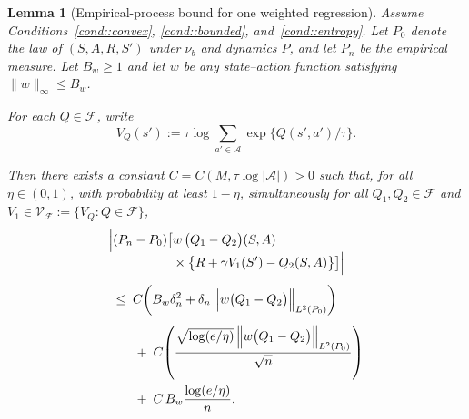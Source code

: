 \documentclass{article}
\theoremstyle{plain}
\newtheorem{lemma}{Lemma}
\theoremstyle{definition}
\theoremstyle{remark}
\begin{document}
\begin{lemma}[Empirical-process bound for one weighted regression]
\label{lemma::empiricalprocess}
Assume Conditions~\ref{cond::convex}, \ref{cond::bounded}, and~\ref{cond::entropy}.
Let $P_0$ denote the law of $(S,A,R,S')$ under $\nu_b$ and dynamics $P$,
and let $P_n$ be the empirical measure.
Let $B_w\ge1$ and let $w$ be any state--action function satisfying
\(\|w\|_\infty\le B_w\).

For each \(Q\in\mathcal F\), write
\[
V_Q(s')
:= \tau\log\sum_{a'\in\mathcal A}\exp\{Q(s',a')/\tau\}.
\]

Then there exists a constant
\(C=C(M,\tau\log|\mathcal A|)>0\) such that, for all
$\eta \in (0,1)$, with probability at least $1 - \eta$,
simultaneously for all \(Q_1,Q_2\in\mathcal F\) and
\(V_1\in\mathcal V_{\mathcal F}:=\{V_Q:Q\in\mathcal F\}\),
\begin{align*}
&\Bigl|
  (P_n - P_0)\big[
    w\,
    \bigl(Q_1-Q_2\bigr)(S,A)
\\[-0.4em]
&\qquad\qquad\quad
    \times
    \bigl\{
      R
      + \gamma V_1(S')
      - Q_2(S,A)
    \bigr\}
  \big]
\Bigr|
\\[0.4em]
&\;\le\;
C\!\left(
  B_w\delta_n^2
  +
  \delta_n\,
  \Bigl\|
    w\bigl(Q_1-Q_2\bigr)
  \Bigr\|_{L^2(P_0)}
\right)
\\[0.4em]
&\qquad+\;
C\!\left(
  \frac{
    \sqrt{\log(e/\eta)}\,
    \Bigl\|
      w\bigl(Q_1-Q_2\bigr)
    \Bigr\|_{L^2(P_0)}
  }{\sqrt{n}}
\right)
\\
&\qquad+\;
C\,B_w\frac{\log(e/\eta)}{n}.
\end{align*}
\end{lemma}
\end{document}
